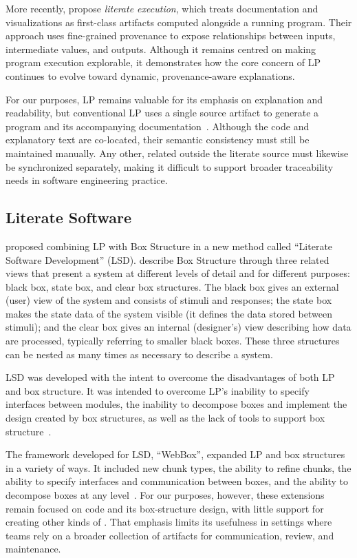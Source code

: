 More recently, \citet{BondEtAl2026} propose \emph{literate
execution}, which treats documentation and visualizations as first-class
artifacts computed alongside a running program. Their approach uses fine-grained
provenance to expose relationships between inputs, intermediate values, and
outputs. Although it remains centred on making program execution explorable, it
demonstrates how the core concern of LP continues to evolve toward dynamic,
provenance-aware explanations.

For our purposes, LP remains valuable for its emphasis on explanation and
readability, but conventional LP uses a single source artifact to generate a
program and its accompanying documentation~\citep{PieterseKourieAndBoake2004}.
Although the code and explanatory text are co-located, their semantic
consistency must still be maintained manually. Any other, related \sfs{}
outside the literate source must likewise be synchronized separately, making
it difficult to support broader traceability needs in software engineering
practice.

\subsection{Literate Software}

\citet{AlMatiiAndBoujarwah2002} proposed combining LP with Box Structure in a
new method called ``Literate Software Development'' (LSD).
\citet{Mills1986} describe Box Structure through three related views that
present a system at different levels of detail and for different purposes:
black box, state box, and clear box structures. The
black box gives an external (user) view of the system and consists of stimuli
and responses; the state box makes the state data of the system visible (it
defines the data stored between stimuli); and the clear box gives an internal
(designer's) view describing how data are processed, typically referring to
smaller black boxes. These three structures can be nested as
many times as necessary to describe a system.

LSD was developed with the intent to overcome the disadvantages of both LP and
box structure. It was intended to overcome LP's
inability to specify interfaces between modules, the inability to decompose
boxes and implement the design created by box structures, as well as the lack
of tools to support box
structure~\citep{AlMatiiAndBoujarwah2002,Deck1996}.

The framework developed for LSD, ``WebBox'', expanded LP and box structures in a
variety of ways. It included new chunk types, the ability to refine chunks, the
ability to specify interfaces and communication between boxes, and the ability
to decompose boxes at any level~\citep{AlMatiiAndBoujarwah2002}. For our
purposes, however, these extensions remain focused on code and its box-structure
design, with little support for creating other kinds of \sfs{}. That emphasis
limits its usefulness in settings where teams rely on a broader collection of
artifacts for communication, review, and maintenance.

